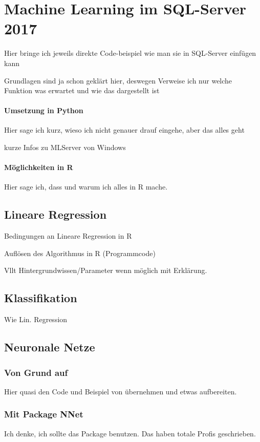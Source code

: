 \section{Machine Learning im SQL-Server 2017}
\label{sec:MLSQL}
Hier bringe ich jeweils direkte Code-beispiel wie man sie in SQL-Server einfügen kann

Grundlagen sind ja schon geklärt hier, deswegen Verweise ich nur welche Funktion was erwartet und wie das dargestellt ist
\paragraph{Umsetzung in Python}
Hier sage ich kurz, wieso ich nicht genauer drauf eingehe, aber das alles geht

kurze Infos zu MLServer von Windows
\paragraph{Möglichkeiten in  R}
Hier sage ich, dass und warum ich alles in R mache.
\subsection{Lineare Regression}
Bedingungen an Lineare Regression in R

Auflösen des Algorithmus in R (Programmcode)

Vllt Hintergrundwissen/Parameter wenn möglich mit Erklärung. 
\subsection{Klassifikation}
Wie Lin. Regression
\subsection{Neuronale Netze}
\subsubsection{Von Grund auf}
Hier quasi den Code und Beispiel von \cite{SelbyNN} übernehmen und etwas aufbereiten.
\subsubsection{Mit Package NNet}
Ich denke, ich sollte das Package benutzen. Das haben totale Profis geschrieben. 